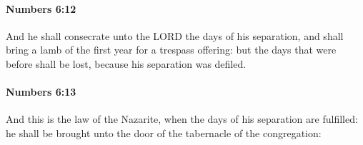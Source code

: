 		\paragraph{Numbers 6:12} %
			\label{NUMBERS-6-12}

			And he shall consecrate unto the LORD the days of his separation, and shall bring a lamb of the first year for a trespass offering: but the days that were before shall be lost, because his separation was defiled.


		\paragraph{Numbers 6:13} %
			\label{NUMBERS-6-13}

			And this is the law of the Nazarite, when the days of his separation are fulfilled: he shall be brought unto the door of the tabernacle of the congregation:


